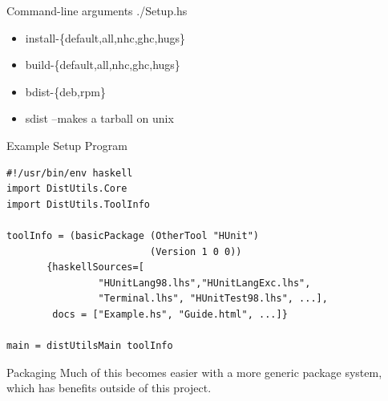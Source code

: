 \documentclass[pdf,rico,slideColor,colorBG]{prosper}
\begin{document}
\begin{slide}{Command-line arguments}
./Setup.hs
\begin{itemize}
  \item install-\{default,all,nhc,ghc,hugs\}
  \item build-\{default,all,nhc,ghc,hugs\}
  \item bdist-\{deb,rpm\}
  \item sdist --makes a tarball on unix
\end{itemize}
\end{slide}

\begin{slide}{Example Setup Program}
\begin{small}
\begin{verbatim}
#!/usr/bin/env haskell
import DistUtils.Core
import DistUtils.ToolInfo

toolInfo = (basicPackage (OtherTool "HUnit")
                         (Version 1 0 0))
	   {haskellSources=[
			    "HUnitLang98.lhs","HUnitLangExc.lhs",
			    "Terminal.lhs", "HUnitTest98.lhs", ...],
	    docs = ["Example.hs", "Guide.html", ...]}

main = distUtilsMain toolInfo
\end{verbatim}
\end{small}
\end{slide}




\begin{slide}{Packaging}
  Much of this becomes easier with a more generic package system,
  which has benefits outside of this project.
\end{slide}
\end{document}
